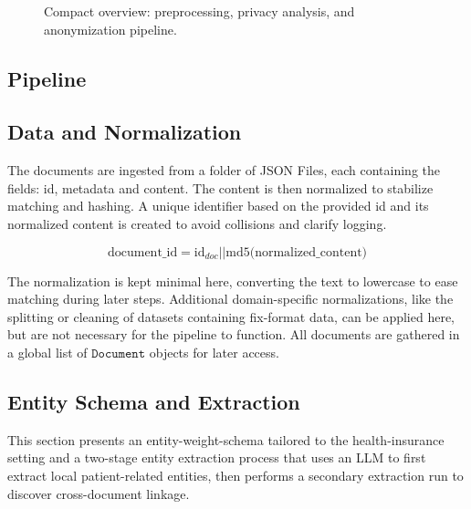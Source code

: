 \begin{figure}[t]
{}
\caption{Compact overview: preprocessing, privacy analysis, and anonymization pipeline.}
\end{figure}

\subsection{Pipeline}
\subsection{Data and Normalization}
The documents are ingested from a folder of JSON Files, each containing the fields: id, metadata and content. The content is then normalized to stabilize matching and hashing. A unique identifier based on the provided id and its normalized content is created to avoid collisions and clarify logging.

\[\mbox{document\_id} = \mbox{id}_{doc} \vert\vert \mbox{md5(normalized\_content)}\]

The normalization is kept minimal here, converting the text to lowercase to ease matching during later steps. Additional domain-specific normalizations, like the splitting or cleaning of datasets containing fix-format data, can be applied here, but are not necessary for the pipeline to function.
All documents are gathered in a global list of $\texttt{Document}$ objects for later access.

\subsection{Entity Schema and Extraction}
This section presents an entity-weight-schema tailored to the health-insurance setting and a two-stage entity extraction process that uses an LLM to first extract local patient-related entities, then performs a secondary extraction run to discover cross-document linkage.

